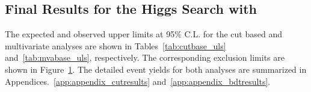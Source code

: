 \clearpage
\subsection{Final Results for the Higgs Search with \intlumiEightTeV{}}
\label{sec:search_results}

The expected and observed upper limits at 95\% C.L. for the cut based and
multivariate analyses are shown in Tables~\ref{tab:cutbase_uls}
and~\ref{tab:mvabase_uls}, respectively. The corresponding exclusion
limits are shown in Figure~\ref{fig:uls}. The detailed event yields 
for both analyses are summarized in Appendices.~\ref{app:appendix_cutresults} 
and~\ref{app:appendix_bdtresults}.

\begin{figure}[!hbtp]
\centering
{}
\centering
{}
\label{fig:uls}
\end{figure}

